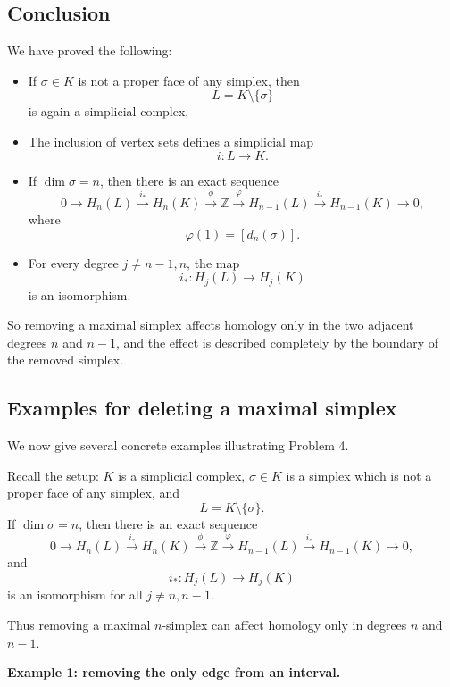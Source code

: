 \documentclass[12pt,a4paper]{article}
\theoremstyle{notespace}
\begin{document}
\subsection{Conclusion}

We have proved the following:

\begin{itemize}
	\item If \(\sigma\in K\) is not a proper face of any simplex, then
	\[
	L=K\setminus\{\sigma\}
	\]
	is again a simplicial complex.
	
	\item The inclusion of vertex sets defines a simplicial map
	\[
	i:L\to K.
	\]
	
	\item If \(\dim \sigma=n\), then there is an exact sequence
	\[
	0\longrightarrow H_n(L)\xrightarrow{i_*} H_n(K)\xrightarrow{\phi} \mathbb Z
	\xrightarrow{\varphi} H_{n-1}(L)\xrightarrow{i_*} H_{n-1}(K)\longrightarrow 0,
	\]
	where
	\[
	\varphi(1)=[d_n(\sigma)].
	\]
	
	\item For every degree \(j\neq n-1,n\), the map
	\[
	i_*:H_j(L)\to H_j(K)
	\]
	is an isomorphism.
\end{itemize}

So removing a maximal simplex affects homology only in the two adjacent degrees \(n\) and \(n-1\), and the effect is described completely by the boundary of the removed simplex.


\subsection{Examples for deleting a maximal simplex}

We now give several concrete examples illustrating Problem 4.

Recall the setup: \(K\) is a simplicial complex, \(\sigma\in K\) is a simplex which is not a proper face of any simplex, and
\[
L=K\setminus\{\sigma\}.
\]
If \(\dim \sigma=n\), then there is an exact sequence
\[
0\longrightarrow H_n(L)\xrightarrow{i_*} H_n(K)\xrightarrow{\phi}\mathbb Z
\xrightarrow{\varphi} H_{n-1}(L)\xrightarrow{i_*} H_{n-1}(K)\longrightarrow 0,
\]
and
\[
i_*:H_j(L)\to H_j(K)
\]
is an isomorphism for all \(j\neq n,n-1\).

Thus removing a maximal \(n\)-simplex can affect homology only in degrees \(n\) and \(n-1\).

\medskip

\textbf{Example 1: removing the only edge from an interval.}
\end{document}
